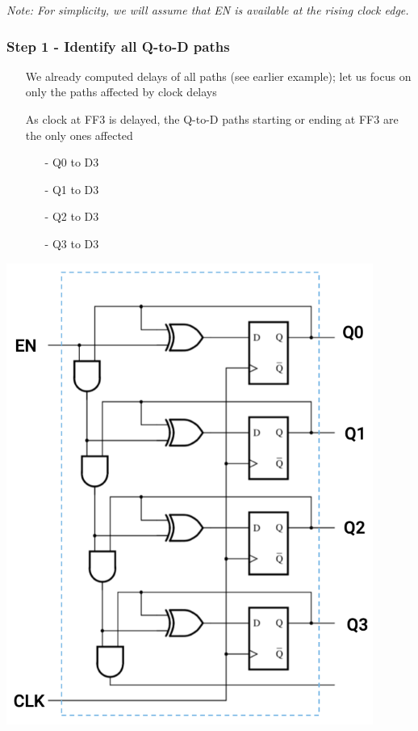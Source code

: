 \documentclass[12pt,openany]{book}
\begin{document}
\textit{Note: For simplicity, we will assume that EN is available at the rising clock edge.}


\subsubsection*{Step 1 - Identify all Q-to-D paths}
\begin{minipage}[htp]{0.45\textwidth}
\begin{itemize}
    \item[] We already computed delays of all paths (see earlier example); let us focus on only the paths affected by clock delays
    \item[] As clock at FF3 is delayed, the Q-to-D paths starting or ending at FF3 are the only ones affected
    \begin{itemize}
        \item[-] Q0 to D3
        \item[-] Q1 to D3
        \item[-] Q2 to D3
        \item[-] Q3 to D3
    \end{itemize}
\end{itemize}
\end{minipage}%
\hfill
\vline
\hfill
\begin{minipage}[htp]{0.45\textwidth}
\includegraphics[width=0.9\textwidth]{circuits/15.7.5.png}
\end{minipage}
\end{document}
